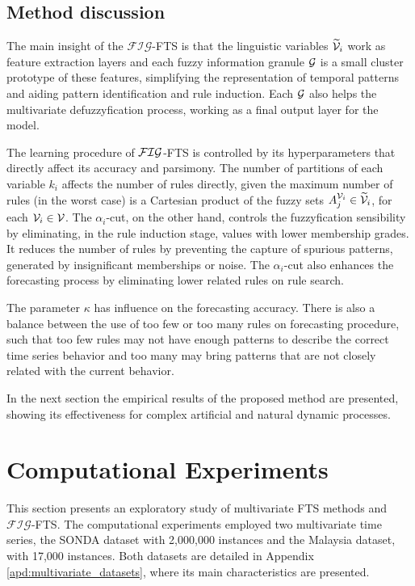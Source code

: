 \subsection{Method discussion}
\label{sec:fig_discussion}

The main insight of the $\mathcal{FIG}$-FTS is that the linguistic variables $\widetilde{\mathcal{V}}_i$ work as feature extraction layers and each fuzzy information granule $\mathcal{G}$ is a small cluster prototype of these features, simplifying the representation of temporal patterns and aiding pattern identification and rule induction. Each $\mathcal{G}$ also helps the multivariate defuzzyfication process, working as a final output layer for the model.

The learning procedure of $\mathcal{FIG}$-FTS is controlled by its hyperparameters that directly affect its accuracy and parsimony. The number of partitions of each variable $k_i$ affects the number of rules directly, given the maximum number of rules (in the worst case) is a Cartesian product of the fuzzy sets $A_j^{\mathcal{V}_i} \in \widetilde{\mathcal{V}}_i$, for each $\mathcal{V}_i \in \mathcal{V}$. The $\alpha_i$-cut, on the other hand, controls the fuzzyfication sensibility by eliminating, in  the rule induction stage, values with lower membership grades. It reduces the number of rules by preventing the capture of spurious patterns, generated by insignificant memberships or noise. The $\alpha_i$-cut also enhances the forecasting process by eliminating lower related rules on rule search.

The parameter $\kappa$ has influence on the forecasting accuracy. There is also a balance between the use of too few or too many rules on forecasting procedure, such that too few rules may not have enough patterns to describe the correct time series behavior and too many may bring patterns that are not closely related with the current behavior.

In the next section the empirical results of the proposed method are presented, showing its effectiveness for complex artificial and natural dynamic processes.

\section{Computational Experiments}
\label{sec:multivariate_experiments}

This section presents an exploratory study of multivariate FTS methods and $\mathcal{FIG}$-FTS. The computational experiments employed two multivariate time series, the SONDA dataset with 2,000,000 instances and the Malaysia dataset, with 17,000 instances. Both datasets are detailed in Appendix \ref{apd:multivariate_datasets}, where its main characteristics are presented.

